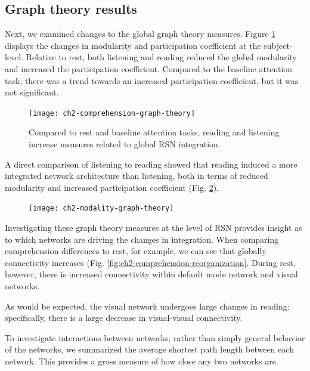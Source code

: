 \subsection{Graph theory results}

Next, we examined changes to the global graph theory measures. Figure \ref{fig:ch2-comprehension-graph-theory} displays the changes in modularity and participation coefficient at the subject-level. Relative to rest, both listening and reading reduced the global modularity and increased the participation coefficient. Compared to the baseline attention task, there was  a trend towards an increased participation coefficient, but it was not significant. 

\begin{figure}[t]
	\centering
	\texttt{[image: ch2-comprehension-graph-theory]}
    \caption[Language induces more integrated global network architecture.]{Compared to rest and baseline attention tasks, reading and listening increase measures related to global RSN integration.}
	\label{fig:ch2-comprehension-graph-theory}
\end{figure}

A direct comparison of listening to reading showed that reading induced a more integrated network architecture than listening, both in terms of reduced modularity and increased participation coefficient (Fig. \ref{fig:ch2-modality-graph-theory}).

\begin{figure}[t]
	\centering
	\texttt{[image: ch2-modality-graph-theory]}
    \caption[Reading is more integrated than listening.]{}
	\label{fig:ch2-modality-graph-theory}
\end{figure}

Investigating these graph theory measures at the level of RSN provides  insight as to which networks are driving the changes in integration. When comparing comprehension differences to rest, for example, we can see that globally connectivity increases (Fig. \ref{fig:ch2-comprehension-reorganization}. During rest, however, there is increased connectivity within default mode network and visual networks.

As would be expected, the visual network undergoes large changes in reading: specifically, there is a large decrease in visual-visual connectivity. 

To investigate interactions between networks, rather than simply general behavior of the networks, we summarized the average shortest path length between each network. This provides a gross measure of how close any two networks are. 

